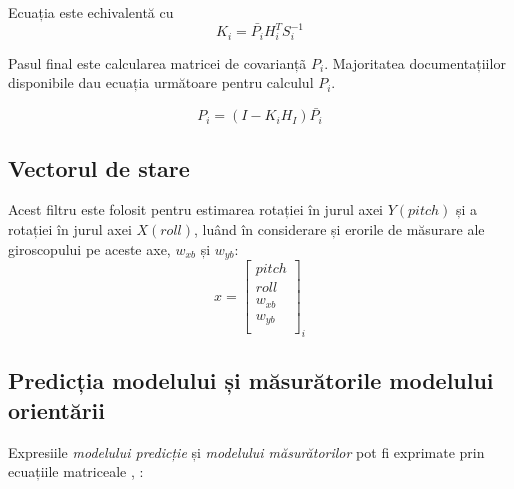 \-\hspace{1cm}Ecuația este echivalentă cu 
\begin{equation}
K_i=\bar{P_i}H_i^TS_i^{-1}
\end{equation}

\-\hspace{1cm}Pasul final este calcularea matricei de covarianțã $P_i$. Majoritatea documentațiilor disponibile
dau ecuația următoare pentru calculul $P_i$.

\begin{equation}
P_i={(I-K_iH_I)}\bar{P_i}
\end{equation}

\subsection{Vectorul de stare}
\-\hspace{1cm}Acest filtru este folosit pentru estimarea rotației în jurul axei $Y(pitch)$ și a rotației în jurul axei $X(roll)$, luând în considerare și erorile de măsurare ale giroscopului pe aceste axe, $w_{xb}$ și $w_{yb}$:
\begin{equation}
{\mathsf{\textit{x}} = 
\begin{bmatrix}
pitch\\
roll\\
w_{xb}\\
w_{yb}\\
\end{bmatrix}}_i
\end{equation}

\subsection{Predicția modelului și măsurătorile modelului orientării }
\-\hspace{1cm}Expresiile \textit{modelului predicție} și \textit{modelului măsurătorilor} pot fi exprimate prin ecuațiile matriceale \cite{Mad}, \cite{quatro}:

